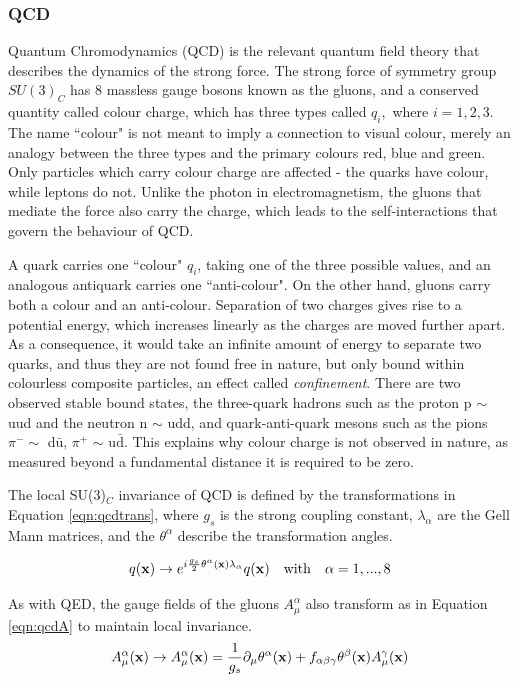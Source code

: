 \subsubsection{QCD}

Quantum Chromodynamics (QCD) is the relevant quantum field theory that describes the dynamics of the strong force. The strong force of symmetry group $SU(3)_{C}$ has 8 massless gauge bosons known as the gluons, and a conserved quantity called colour charge, which has three types called $q_{i},$ where $i=1, 2, 3$. The name ``colour" is not meant to imply a connection to visual colour, merely an analogy between the three types and the primary colours red, blue and green. Only particles which carry colour charge are affected - the quarks have colour, while leptons do not. Unlike the photon in electromagnetism, the gluons that mediate the force also carry the charge, which leads to the self-interactions that govern the behaviour of QCD. 

A quark carries one ``colour" $q_{i}$, taking one of the three possible values, and an analogous antiquark carries one ``anti-colour". On the other hand, gluons carry both a colour and an anti-colour.  Separation of two charges gives rise to a potential energy, which increases linearly as the charges are moved further apart. As a consequence, it would take an infinite amount of energy to separate two quarks, and thus they are not found free in nature, but only bound within colourless composite particles, an effect called \textit{confinement}. There are two observed stable bound states, the three-quark hadrons such as the proton p $\sim$ uud and the neutron n $\sim$ udd, and quark-anti-quark mesons such as the pions $\pi^{-} \sim$ d$\bar{\textrm{u}}$, $\pi^{+}$ $\sim$ u$\bar{\textrm{d}}$. This explains why colour charge is not observed in nature, as measured beyond a fundamental distance it is required to be zero.

The local SU(3)$_{C}$ invariance of QCD is defined by the transformations in Equation \ref{eqn:qcdtrans}, where $g_{s}$ is the strong coupling constant, $\lambda_{\alpha}$ are the Gell Mann matrices, and the $\theta^{\alpha}$ describe the transformation angles. 

\begin{equation}
q(\mathbf{x}) \rightarrow e^{i\frac{g_{s}}{2}\theta^{\alpha}(\mathbf{x}) \lambda_{\alpha}} q(\mathbf{x}) \quad \mathrm{with} \quad \alpha = 1, ... , 8
\label{eqn:qcdtrans}
\end{equation}


As with QED, the gauge fields of the gluons $A^{\alpha}_{\mu} $ also transform as in Equation \ref{eqn:qcdA} to maintain local invariance. 
\begin{equation}
A^{\alpha}_{\mu}(\mathbf{x}) \rightarrow A^{\alpha}_{\mu}(\mathbf{x}) = \frac{1}{g_{s}} \partial_{\mu}\theta^{\alpha}(\mathbf{x}) + f_{\alpha \beta \gamma}\theta^{\beta}(\mathbf{x})A^{\gamma}_{\mu}(\mathbf{x})
\label{eqn:qcdA}
\end{equation}


